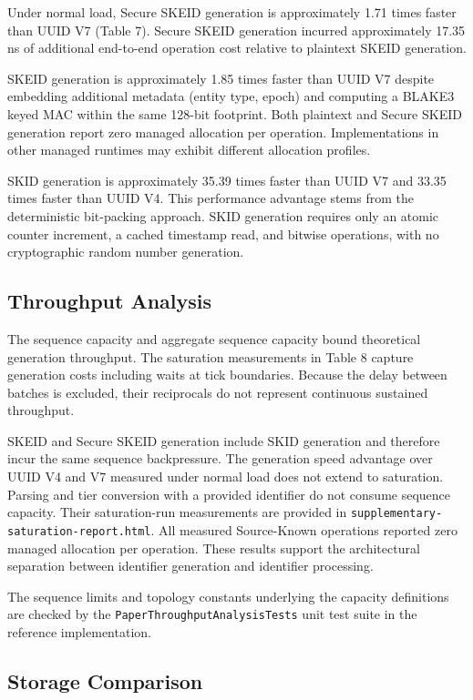 \documentclass[a4paper,fleqn]{cas-sc}
\begin{document}
Under normal load, Secure SKEID generation is approximately 1.71 times
faster than UUID V7 (Table 7). Secure SKEID generation incurred
approximately 17.35 ns of additional end-to-end operation cost relative
to plaintext SKEID generation.

SKEID generation is approximately 1.85 times faster than UUID V7 despite
embedding additional metadata (entity type, epoch) and computing a
BLAKE3 keyed MAC within the same 128-bit footprint. Both plaintext and
Secure SKEID generation report zero managed allocation per operation.
Implementations in other managed runtimes may exhibit different
allocation profiles.

SKID generation is approximately 35.39 times faster than UUID V7 and
33.35 times faster than UUID V4. This performance advantage stems from
the deterministic bit-packing approach. SKID generation requires only an
atomic counter increment, a cached timestamp read, and bitwise
operations, with no cryptographic random number generation.

\subsection{Throughput Analysis}\label{throughput-analysis}

The sequence capacity and aggregate sequence capacity bound theoretical
generation throughput. The saturation measurements in Table 8 capture
generation costs including waits at tick boundaries. Because the delay
between batches is excluded, their reciprocals do not represent
continuous sustained throughput.

SKEID and Secure SKEID generation include SKID generation and therefore
incur the same sequence backpressure. The generation speed advantage
over UUID V4 and V7 measured under normal load does not extend to
saturation. Parsing and tier conversion with a provided identifier do
not consume sequence capacity. Their saturation-run measurements are
provided in \texttt{supplementary-saturation-report.html}. All measured
Source-Known operations reported zero managed allocation per operation.
These results support the architectural separation between identifier
generation and identifier processing.

The sequence limits and topology constants underlying the capacity
definitions are checked by the \texttt{PaperThroughputAnalysisTests}
unit test suite in the reference implementation.

\subsection{Storage Comparison}\label{storage-comparison}
\end{document}
